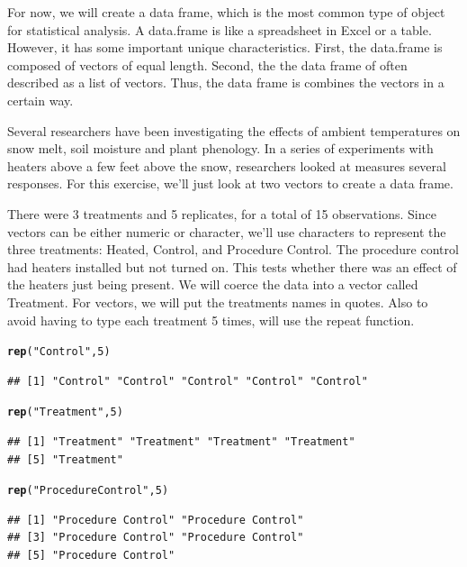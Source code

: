 \documentclass{tufte-handout}\usepackage[]{graphicx}\usepackage[]{xcolor}
\makeatletter
\newcommand{\hlnum}[1]{\textcolor[rgb]{0.686,0.059,0.569}{#1}}%
\newcommand{\hlstr}[1]{\textcolor[rgb]{0.192,0.494,0.8}{#1}}%
\newcommand{\hlstd}[1]{\textcolor[rgb]{0.345,0.345,0.345}{#1}}%
\newcommand{\hlkwd}[1]{\textcolor[rgb]{0.737,0.353,0.396}{\textbf{#1}}}%
\newenvironment{kframe}{%
 \def\at@end@of@kframe{}%
 \ifinner\ifhmode%
  \def\at@end@of@kframe{\end{minipage}}%
  \begin{minipage}{\columnwidth}%
 \fi\fi%
 \def\FrameCommand##1{\hskip\@totalleftmargin \hskip-\fboxsep
 \colorbox{shadecolor}{##1}\hskip-\fboxsep
     \hskip-\linewidth \hskip-\@totalleftmargin \hskip\columnwidth}%
 \MakeFramed {\advance\hsize-\width
   \@totalleftmargin\z@ \linewidth\hsize
   \@setminipage}}%
 {\par\unskip\endMakeFramed%
 \at@end@of@kframe}
\newenvironment{knitrout}{}{} %
\makeatother
\begin{document}
For now, we will create a data frame, which is the most common type of object for statistical analysis. A data.frame is like a spreadsheet in Excel or a table. However, it has some important unique characteristics. First, the data.frame is composed of vectors of equal length. Second, the the data frame of often described as a list of vectors. Thus, the data frame is combines the vectors in a certain way. 

Several researchers have been investigating the effects of ambient temperatures on snow melt, soil moisture and plant phenology. In a series of experiments with heaters above a few feet above the snow, researchers looked at measures several responses. For this exercise, we'll just look at two vectors to create a data frame.

There were 3 treatments and 5 replicates, for a total of 15 observations. Since vectors can be either numeric or character, we'll use characters to represent the three treatments: Heated, Control, and Procedure Control. The procedure control had heaters installed but not turned on. This tests whether there was an effect of the heaters just being present. We will coerce the data into a vector called Treatment.
For vectors, we will put the treatments names in quotes. Also to avoid having to type each treatment 5 times, will use the repeat function.


\begin{knitrout}
\color{fgcolor}\begin{kframe}
\begin{alltt}
\hlkwd{rep}\hlstd{(}\hlstr{"Control"}\hlstd{,} \hlnum{5}\hlstd{)}
\end{alltt}
\begin{verbatim}
## [1] "Control" "Control" "Control" "Control" "Control"
\end{verbatim}
\begin{alltt}
\hlkwd{rep}\hlstd{(}\hlstr{"Treatment"}\hlstd{,} \hlnum{5}\hlstd{)}
\end{alltt}
\begin{verbatim}
## [1] "Treatment" "Treatment" "Treatment" "Treatment"
## [5] "Treatment"
\end{verbatim}
\begin{alltt}
\hlkwd{rep}\hlstd{(}\hlstr{"Procedure Control"}\hlstd{,} \hlnum{5}\hlstd{)}
\end{alltt}
\begin{verbatim}
## [1] "Procedure Control" "Procedure Control"
## [3] "Procedure Control" "Procedure Control"
## [5] "Procedure Control"
\end{verbatim}
\end{kframe}
\end{knitrout}
\end{document}
